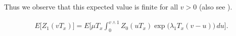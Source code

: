 Thus we observe that this expected value is finite for all $v>0$ (also see \cite{koon,zvai,xjon,marg}).

\begin{eqnarray}
E \bigl[Z_1(vT_x) \bigr]= E
\biggl[\mu T_x\int_0^{v\wedge
1}Z_0(uT_x)
\exp \bigl(\lambda_1T_x(v-u) \bigr)\,du \biggr].
\end{eqnarray}